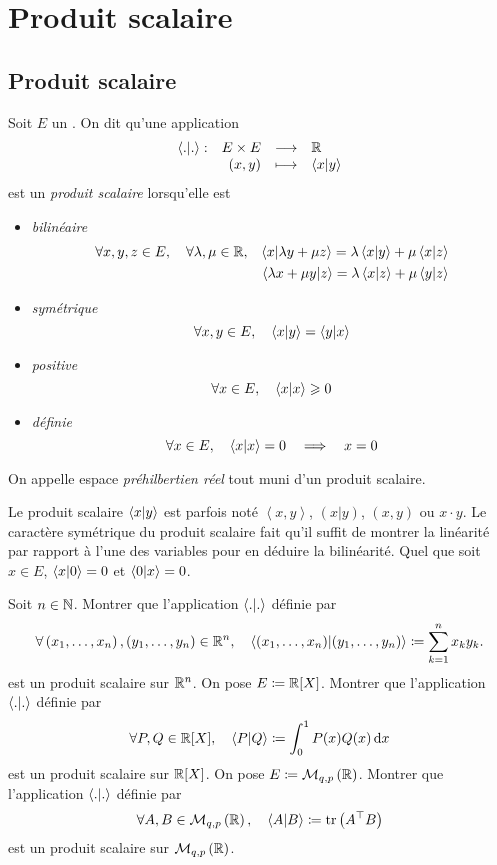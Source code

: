\documentclass{magnolia}
\begin{document}
\magtoc

\section{Produit scalaire}
\subsection{Produit scalaire}

\begin{definition}[utile=-3]
Soit $E$ un \Rev. On dit qu'une application
\[\begin{array}[t]{lrcl} \displaystyle{\left\langle {.}\middle|{.}\right\rangle} : & \displaystyle{E\times E} & \longrightarrow & \displaystyle{\mathbb{R}} \\ & \displaystyle{\left(x,y\right)} & \longmapsto & \displaystyle{\left\langle {x}\middle|{y}\right\rangle} \end{array}\]
est un \emph{produit scalaire} lorsqu'elle est
\begin{itemize}
\item \emph{bilinéaire}
  \begin{eqnarray*}
  \forall x,y,z\in E ,\quad \forall \lambda,\mu\in\mathbb{R},
  &&\left\langle {x}\middle|{\lambda y+\mu z}\right\rangle=\lambda\left\langle {x}\middle|{y}\right\rangle+\mu\left\langle {x}\middle|{z}\right\rangle\\
  &&\left\langle {\lambda x+\mu y}\middle|{z}\right\rangle=\lambda\left\langle {x}\middle|{z}\right\rangle+\mu\left\langle {y}\middle|{z}\right\rangle
  \end{eqnarray*}
\item \emph{symétrique}
  \[\forall x,y\in E ,\quad \left\langle {x}\middle|{y}\right\rangle=\left\langle {y}\middle|{x}\right\rangle\]
\item \emph{positive}
  \[\forall x\in E ,\quad \left\langle {x}\middle|{x}\right\rangle\geqslant 0\]
\item \emph{définie}
  \[\forall x\in E ,\quad \left\langle {x}\middle|{x}\right\rangle=0 \quad\Longrightarrow\quad x=0\]
\end{itemize}
On appelle espace \emph{préhilbertien réel} tout \Rev muni d'un produit scalaire.
\end{definition}

\begin{remarques}
\remarque Le produit scalaire $\left\langle {x}\middle|{y}\right\rangle$ est parfois noté $\left\langle x,y\right\rangle$, $(x|y)$,
  $(x,y)$ ou $x\cdot y$.
\remarque Le caractère symétrique du produit scalaire fait qu'il suffit de montrer
  la linéarité par rapport à l'une des variables pour en déduire la bilinéarité.
\remarque Quel que soit $x\in E$, $\left\langle {x}\middle|{0}\right\rangle=0$ et $\left\langle {0}\middle|{x}\right\rangle=0$.
\end{remarques}

\begin{exos}
\exo Soit $n\in\mathbb{N}$. Montrer que l'application $\left\langle {.}\middle|{.}\right\rangle$ définie par
  \[\forall \left(x_1,\ldots,x_n\right),\left(y_1,\ldots,y_n\right)\in\mathbb{R}^n ,\quad
    \left\langle {\left(x_1,\ldots,x_n\right)}\middle|{\left(y_1,\ldots,y_n\right)}\right\rangle\coloneqq\sum_{k=1}^n x_k y_k.\]
  est un produit scalaire sur $\mathbb{R}^n$.
\exo On pose $E\defeq\polyR$. Montrer que l'application $\left\langle {.}\middle|{.}\right\rangle$ définie par
  \[\forall P,Q\in\polyR \qsep \ps{P}{Q}\defeq\integ{0}{1}{P(x)Q(x)}{x}\]
  est un produit scalaire sur $\polyR$.
\exo On pose $E\coloneqq\mathcal{M}_{q,p}\left(\mathbb{R}\right)$. Montrer que l'application $\left\langle {.}\middle|{.}\right\rangle$ définie par
  \[\forall A,B\in\mathcal{M}_{q,p}\left(\mathbb{R}\right) ,\quad \left\langle {A}\middle|{B}\right\rangle\coloneqq \operatorname{tr}\left({A}^{\top}B\right)\]
  est un produit scalaire sur $\mathcal{M}_{q,p}\left(\mathbb{R}\right)$.
\end{exos}
\end{document}
